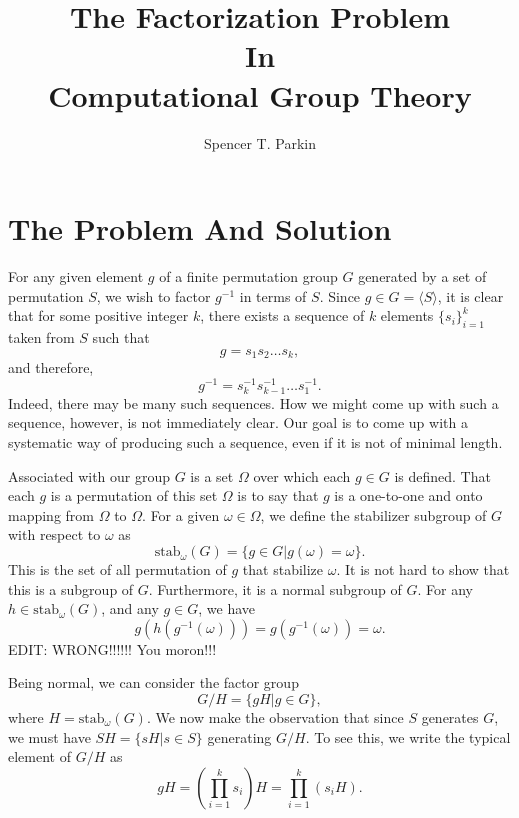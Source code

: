 \documentclass[12pt]{article}
\title{The Factorization Problem\\In\\Computational Group Theory}
\author{Spencer T. Parkin}
\newcommand{\stab}{\mbox{stab}}
\begin{document}
\maketitle

\section*{The Problem And Solution}

For any given element $g$ of a finite permutation group $G$ generated
by a set of permutation $S$, we wish to factor $g^{-1}$ in terms of $S$.
Since $g\in G=\langle S\rangle$, it is clear that for some positive integer $k$, there exists
a sequence of $k$ elements $\{s_i\}_{i=1}^k$ taken from $S$ such that
\begin{equation*}
g = s_1s_2\dots s_k,
\end{equation*}
and therefore,
\begin{equation*}
g^{-1} = s_k^{-1}s_{k-1}^{-1}\dots s_1^{-1}.
\end{equation*}
Indeed, there may be many such sequences.
How we might come up with such a sequence, however, is not immediately clear.
Our goal is to come up with a systematic way of producing such a sequence, even if it
is not of minimal length.

Associated with our group $G$ is a set $\Omega$ over which each $g\in G$ is defined.
That each $g$ is a permutation of this set $\Omega$ is to say that $g$ is a one-to-one and onto
mapping from $\Omega$ to $\Omega$.
For a given $\omega\in\Omega$,
we define the stabilizer subgroup of $G$ with respect to $\omega$ as
\begin{equation*}
\stab_{\omega}(G) = \{g\in G|g(\omega)=\omega\}.
\end{equation*}
This is the set of all permutation of $g$ that stabilize $\omega$.  It is not hard to show
that this is a subgroup of $G$.  Furthermore, it is a normal subgroup of $G$.  
For any $h\in\stab_{\omega}(G)$,
and any $g\in G$, we have
\begin{equation*}
g(h(g^{-1}(\omega))) = g(g^{-1}(\omega)) = \omega.
\end{equation*}
EDIT: WRONG!!!!!!  You moron!!!

Being normal, we can consider the factor group
\begin{equation*}
G/H = \{gH|g\in G\},
\end{equation*}
where $H=\stab_{\omega}(G)$.  We now make the observation that since $S$
generates $G$, we must have $SH=\{sH|s\in S\}$ generating $G/H$.  To see this, we write
the typical element of $G/H$ as
\begin{equation*}
gH = \left(\prod_{i=1}^k s_i\right)H = \prod_{i=1}^k (s_iH).
\end{equation*}
\end{document}
